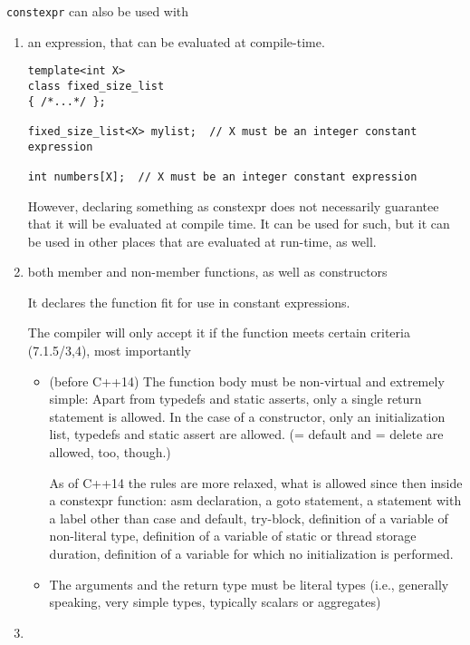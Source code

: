 \verb!constexpr! can also be used with
\begin{enumerate}
  \item an expression, that can be evaluated at compile-time.
  
\begin{lstlisting}
template<int X>
class fixed_size_list
{ /*...*/ };

fixed_size_list<X> mylist;  // X must be an integer constant expression

int numbers[X];  // X must be an integer constant expression
\end{lstlisting}


However, declaring something as constexpr does not necessarily guarantee that it
will be evaluated at compile time. It can be used for such, but it can be used
in other places that are evaluated at run-time, as well.



  \item   both member and non-member functions, as well as constructors

  
  It declares the function fit for use in constant expressions. 

The compiler will only accept it if the function meets certain criteria (7.1.5/3,4), most importantly
\begin{itemize}
  
  \item  (before C++14) The function body must be non-virtual and extremely simple: Apart from
  typedefs and static asserts, only a single return statement is allowed. In the
  case of a constructor, only an initialization list, typedefs and static assert
  are allowed. (= default and = delete are allowed, too, though.)
  
  As of C++14 the rules are more relaxed, what is allowed since then inside a
  constexpr function: asm declaration, a goto statement, a statement with a
  label other than case and default, try-block, definition of a variable of
  non-literal type, definition of a variable of static or thread storage
  duration, definition of a variable for which no initialization is performed.
  
  \item The arguments and the return type must be literal types (i.e., generally
  speaking, very simple types, typically scalars or aggregates)
  
\end{itemize}

  \item 
\end{enumerate}



